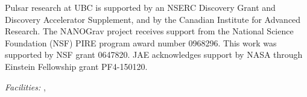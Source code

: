 \documentclass[iop,apj,tighten]{emulateapj}
\begin{document}






\acknowledgements
Pulsar research at UBC is supported by an NSERC Discovery Grant and Discovery
Accelerator Supplement, and by the Canadian Institute for Advanced Research.
The NANOGrav project receives support from the National Science Foundation
(NSF) PIRE program award number 0968296. This work was supported by NSF grant 0647820.
JAE acknowledges support by NASA through Einstein Fellowship grant PF4-150120.


{\it Facilities:}
, 

%



\end{document}
